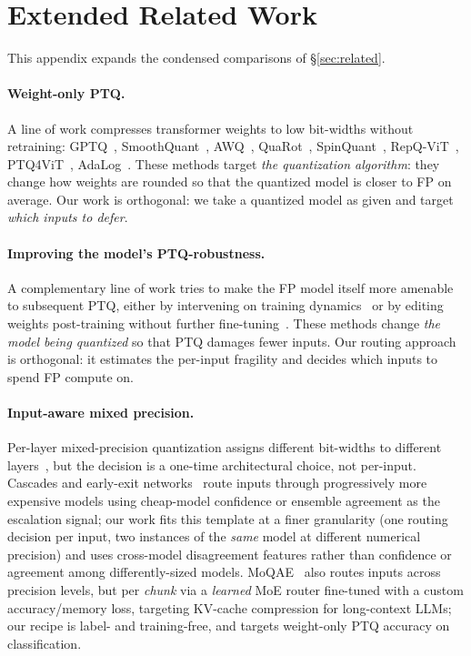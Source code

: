 \documentclass{article}
\newcommand{\fp}{\textsc{FP}\xspace}
\newcommand{\ptq}{\textsc{PTQ}\xspace}
\begin{document}
\section{Extended Related Work}\label{app:related}

This appendix expands the condensed comparisons of \S\ref{sec:related}.

\paragraph{Weight-only \ptq.}
A line of work compresses transformer weights to low bit-widths without retraining: GPTQ~\cite{frantar2023gptq}, SmoothQuant~\cite{xiao2023smoothquant}, AWQ~\cite{lin2024awq}, QuaRot~\cite{ashkboos2024quarot}, SpinQuant~\cite{liu2024spinquant}, RepQ-ViT~\cite{li2023repqvit}, PTQ4ViT~\cite{ptq4vit}, AdaLog~\cite{adalog}.
These methods target \emph{the quantization algorithm}: they change how weights are rounded so that the quantized model is closer to \fp{} on average.
Our work is orthogonal: we take a quantized model as given and target \emph{which inputs to defer}.

\paragraph{Improving the model's PTQ-robustness.}
A complementary line of work tries to make the \fp{} model itself more amenable to subsequent \ptq{}, either by intervening on training dynamics~\cite{catalan2025training, jacob2018quantization} or by editing weights post-training without further fine-tuning~\cite{solombrino2026zeroshotquantizationweightspacearithmetic}. These methods change \emph{the model being quantized} so that \ptq{} damages fewer inputs. Our routing approach is orthogonal: it estimates the per-input fragility and decides which inputs to spend \fp{} compute on.

\paragraph{Input-aware mixed precision.}
Per-layer mixed-precision quantization assigns different bit-widths to different layers~\cite{dong2019hawq}, but the decision is a one-time architectural choice, not per-input.
Cascades and early-exit networks~\cite{teerapittayanon2016branchynet,huang2018msdnet,kolawole2024revisiting} route inputs through progressively more expensive models using cheap-model confidence or ensemble agreement as the escalation signal; our work fits this template at a finer granularity (one routing decision per input, two instances of the \emph{same} model at different numerical precision) and uses cross-model disagreement features rather than confidence or agreement among differently-sized models.
MoQAE~\cite{tao2025moqae} also routes inputs across precision levels, but per \emph{chunk} via a \emph{learned} MoE router fine-tuned with a custom accuracy/memory loss, targeting KV-cache compression for long-context LLMs; our recipe is label- and training-free, and targets weight-only \ptq{} accuracy on classification.
\end{document}

